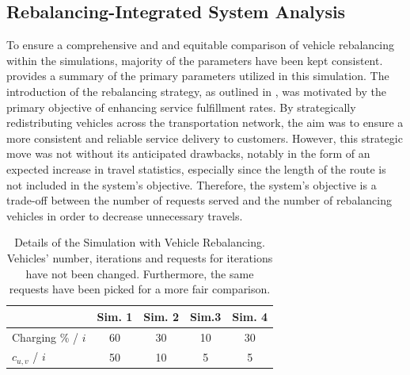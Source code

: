 \subsection{Rebalancing-Integrated System Analysis}
To ensure a comprehensive and and equitable comparison of vehicle rebalancing within the simulations, majority of the parameters have been kept consistent.  provides a summary of the primary parameters utilized in this simulation. The introduction of the rebalancing strategy, as outlined in , was motivated by the primary objective of enhancing service fulfillment rates. By strategically redistributing vehicles across the transportation network, the aim was to ensure a more consistent and reliable service delivery to customers. However, this strategic move was not without its anticipated drawbacks, notably in the form of an expected increase in travel statistics, especially since the length of the route is not included in the system's objective. Therefore, the system's objective is a trade-off between the number of requests served and the number of rebalancing vehicles in order to decrease unnecessary travels. \\
\begin{table}[h]
	\centering
	\begin{tabular}{ |l| c|c|c|c|}
		\hline
		&Sim. 1 & Sim. 2& Sim.3&Sim. 4\\
		\hline
		Charging \% / $i$ & 60&30&10&30\\
		$c_{u,v}$  / $i$ & 50&10&5&5\\
	\end{tabular}
	\caption[Details of the Simulation with Vehicle Rebalancing]{Details of the Simulation with Vehicle Rebalancing. Vehicles' number, iterations and requests for iterations have not been changed. Furthermore, the same requests have been picked for a more fair comparison.}
	\label{tab:rebalancing_with_simu}   
\end{table} 

